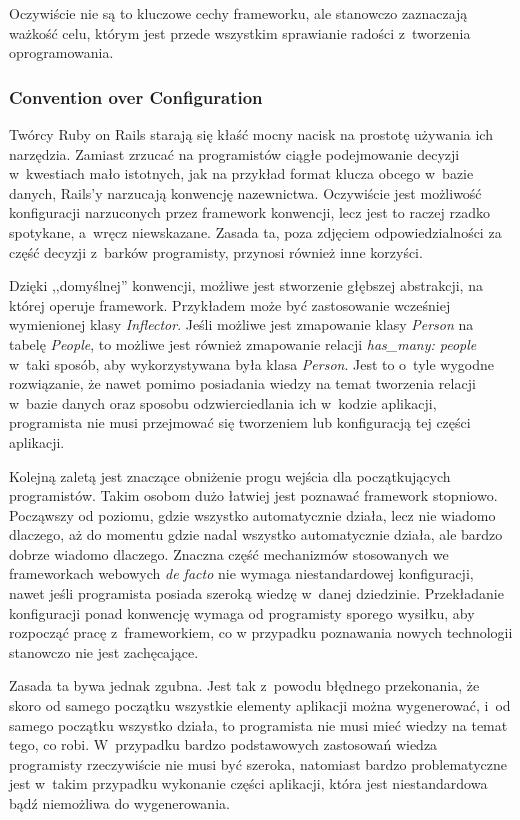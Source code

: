 \documentclass[mgr,oneside]{mgr}
\begin{document}
Oczywiście nie są to kluczowe cechy frameworku, ale stanowczo zaznaczają ważkość celu, którym jest przede wszystkim sprawianie radości z~tworzenia oprogramowania.

\subsubsection{Convention over Configuration}
Twórcy Ruby on Rails starają się kłaść mocny nacisk na prostotę używania ich narzędzia. Zamiast zrzucać na programistów ciągłe podejmowanie decyzji w~kwestiach mało istotnych, jak na przykład format klucza obcego w~bazie danych, Rails'y narzucają konwencję nazewnictwa. Oczywiście jest możliwość konfiguracji narzuconych przez framework konwencji, lecz jest to raczej rzadko spotykane, a~wręcz niewskazane. Zasada ta, poza zdjęciem odpowiedzialności za część decyzji z~barków programisty, przynosi również inne korzyści.

Dzięki ,,domyślnej'' konwencji, możliwe jest stworzenie głębszej abstrakcji, na której operuje framework. Przykładem może być zastosowanie wcześniej wymienionej klasy \emph{Inflector}. Jeśli możliwe jest zmapowanie klasy \emph{Person} na tabelę \emph{People}, to możliwe jest również zmapowanie relacji \emph{has\_many: people} w~taki sposób, aby wykorzystywana była klasa \textit{Person}. Jest to o~tyle wygodne rozwiązanie, że nawet pomimo posiadania wiedzy na temat tworzenia relacji w~bazie danych oraz sposobu odzwierciedlania ich w~kodzie aplikacji, programista nie musi przejmować się tworzeniem lub konfiguracją tej części aplikacji.

Kolejną zaletą jest znaczące obniżenie progu wejścia dla początkujących programistów. Takim osobom dużo łatwiej jest poznawać framework stopniowo. Począwszy od poziomu, gdzie wszystko automatycznie działa, lecz nie wiadomo dlaczego, aż do momentu gdzie nadal wszystko automatycznie działa, ale bardzo dobrze wiadomo dlaczego. Znaczna część mechanizmów stosowanych we frameworkach webowych \emph{de facto} nie wymaga niestandardowej konfiguracji, nawet jeśli programista posiada szeroką wiedzę w~danej dziedzinie. Przekładanie konfiguracji ponad konwencję wymaga od programisty sporego wysiłku, aby rozpocząć pracę z~frameworkiem, co w przypadku poznawania nowych technologii stanowczo nie jest zachęcające.

Zasada ta bywa jednak zgubna. Jest tak z~powodu błędnego przekonania, że skoro od samego początku wszystkie elementy aplikacji można wygenerować, i~od samego początku wszystko działa, to programista nie musi mieć wiedzy na temat tego, co robi. W~przypadku bardzo podstawowych zastosowań wiedza programisty rzeczywiście nie musi być szeroka, natomiast bardzo problematyczne jest w~takim przypadku wykonanie części aplikacji, która jest niestandardowa bądź niemożliwa do wygenerowania.
\end{document}
